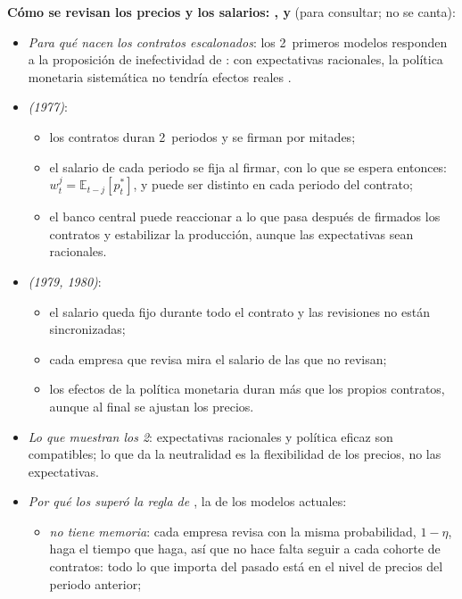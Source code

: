 \documentclass[11pt]{article}
\begin{document}
\begin{anotaciones}
\textbf{Cómo se revisan los precios y los salarios: ,  y } (para consultar; no se canta):
\begin{itemize}
\item \emph{Para qué nacen los contratos escalonados}: los 2~primeros modelos responden a la proposición de inefectividad de \textcite{SargentWallace1975Rational}: con expectativas racionales, la política monetaria sistemática no tendría efectos reales .
\item \emph{ (1977)}:
  \begin{itemize}
  \item los contratos duran 2~periodos y se firman por mitades;
  \item el salario de cada periodo se fija al firmar, con lo que se espera entonces: $w^j_t=\mathbb{E}_{t-j}[p^*_t]$, y puede ser distinto en cada periodo del contrato;
  \item el banco central puede reaccionar a lo que pasa después de firmados los contratos y estabilizar la producción, aunque las expectativas sean racionales.
  \end{itemize}
\item \emph{ (1979, 1980)}\nocite{Taylor1979Staggered}:
  \begin{itemize}
  \item el salario queda fijo durante todo el contrato y las revisiones no están sincronizadas;
  \item cada empresa que revisa mira el salario de las que no revisan;
  \item los efectos de la política monetaria duran más que los propios contratos, aunque al final se ajustan los precios.
  \end{itemize}
\item \emph{Lo que muestran los 2}: expectativas racionales y política eficaz son compatibles; lo que da la neutralidad es la flexibilidad de los precios, no las expectativas.
\item \emph{Por qué los superó la regla de \textcite{Calvo1983Staggered}}, la de los modelos actuales:
  \begin{itemize}
  \item \emph{no tiene memoria}: cada empresa revisa con la misma probabilidad, $1-\eta$, haga el tiempo que haga, así que no hace falta seguir a cada cohorte de contratos: todo lo que importa del pasado está en el nivel de precios del periodo anterior;

\end{itemize}
\end{itemize}
\end{anotaciones}
\end{document}
